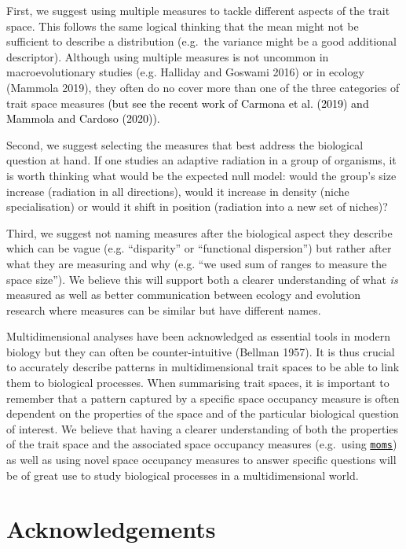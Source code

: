 \documentclass[]{article}
\begin{document}
First, we suggest using multiple measures to tackle different aspects of
the trait space. This follows the same logical thinking that the mean
might not be sufficient to describe a distribution (e.g.~the variance
might be a good additional descriptor). Although using multiple measures
is not uncommon in macroevolutionary studies (e.g. Halliday and Goswami
2016) or in ecology (Mammola 2019), they often do no cover more than one
of the three categories of trait space measures
\textcolor{black}{(but see the recent work of Carmona
et al. (2019) and Mammola and Cardoso (2020)).}

Second, we suggest selecting the measures that best address the
biological question at hand. If one studies an adaptive radiation in a
group of organisms, it is worth thinking what would be the expected null
model: would the group's size increase (radiation in all directions),
would it increase in density (niche specialisation) or would it shift in
position (radiation into a new set of niches)?

Third, we suggest not naming measures after the biological aspect they
describe which can be vague (e.g. ``disparity'' or ``functional
dispersion'') but rather after what they are measuring and why (e.g.
``we used sum of ranges to measure the space size''). We believe this
will support both a clearer understanding of what \emph{is} measured as
well as better communication between ecology and evolution research
where measures can be similar but have different names.

Multidimensional analyses have been acknowledged as essential tools in
modern biology but they can often be counter-intuitive (Bellman 1957).
It is thus crucial to accurately describe patterns in multidimensional
trait spaces to be able to link them to biological processes. When
summarising trait spaces, it is important to remember that a pattern
captured by a specific space occupancy measure is often dependent on the
properties of the space and of the particular biological question of
interest. We believe that having a clearer understanding of both the
properties of the trait space and the associated space occupancy
measures (e.g.~using
\href{https://tguillerme.shinyapps.io/moms/}{\texttt{moms}}) as well as
using novel space occupancy measures to answer specific questions will
be of great use to study biological processes in a multidimensional
world.

\section{Acknowledgements}\label{acknowledgements}
\end{document}
